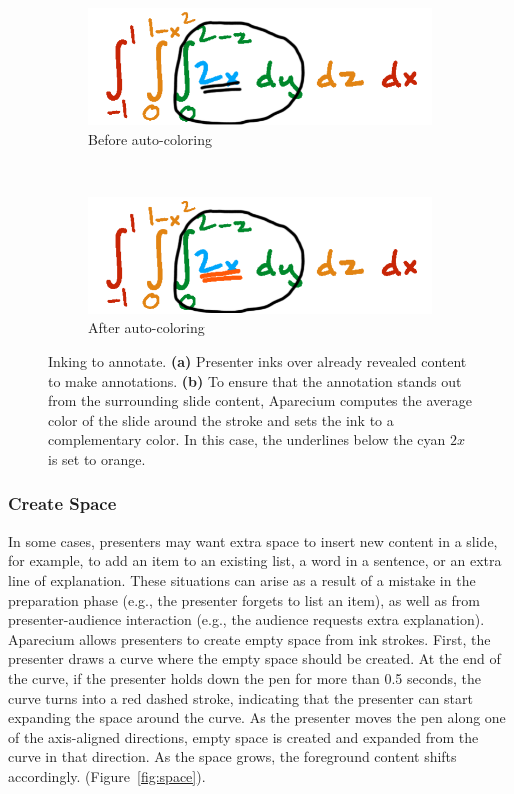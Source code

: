 \begin{figure}[h!]
    \centering
    \begin{subfigure}[t]{0.5\columnwidth}
        \centering
        \includegraphics[width=1\columnwidth]{figures/annotate_presenter}
                        \captionsetup{font=footnotesize}
        \caption{Before auto-coloring}
    \end{subfigure}%
    ~ 
    \begin{subfigure}[t]{0.5\columnwidth}
        \centering
        \includegraphics[width=1\columnwidth]{figures/annotate_audience}
                        \captionsetup{font=footnotesize}
\caption{After auto-coloring}
    \end{subfigure}
    \caption{Inking to annotate. \textbf{(a)} Presenter inks over already revealed content to make annotations. \textbf{(b)} To ensure that the annotation stands out from the surrounding slide content, Aparecium computes the average color of the slide around the stroke and sets the ink to a complementary color. In this case, the underlines below the cyan $2x$ is set to orange.}
    \label{fig:annotate}
\end{figure}

\subsubsection{Create Space}
In some cases, presenters may want extra space to insert new content in a slide, for example, to add an item to an existing list, a word in a sentence, or an extra line of explanation. These situations can arise as a result of a mistake in the preparation phase (e.g., the presenter forgets to list an item), as well as from presenter-audience interaction (e.g., the audience requests extra explanation). Aparecium allows presenters to create empty space from ink strokes. First, the presenter draws a curve where the empty space should be created. At the end of the curve, if the presenter holds down the pen for more than 0.5 seconds, the curve turns into a red dashed stroke, indicating that the presenter can start expanding the space around the curve. As the presenter moves the pen along one of the axis-aligned directions, empty space is created and expanded from the curve in that direction.  As the space grows, the foreground content shifts accordingly. (Figure~\ref{fig:space}).

